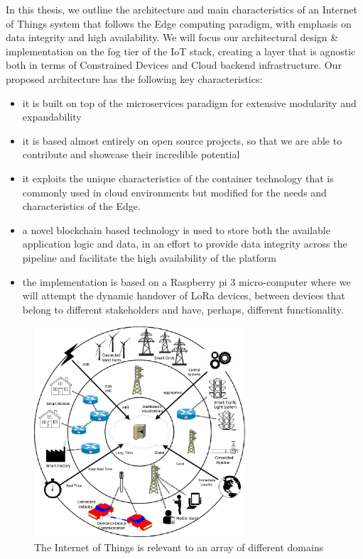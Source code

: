 In this thesis, we outline the architecture and main characteristics of an Internet of Things system that follows the Edge computing paradigm, with emphasis on data integrity and high availability. We will focus our architectural design \& implementation on the fog tier of the IoT stack, creating a layer that is agnostic both in terms of Constrained Devices and Cloud backend infrastructure. Our proposed architecture has the following key characteristics:
\begin{itemize}
 \item it is built on top of the microservices paradigm for extensive modularity and expandability
  \item it is based almost entirely on open source projects, so that we are able to contribute and showcase their incredible potential
 \item it exploits the unique characteristics of the container technology that is commonly used in cloud environments but modified for the needs and characteristics of the Edge.
 \item a novel blockchain based technology is used to store both the available application logic and data, in an effort to provide data integrity across the pipeline and facilitate  the high availability of the platform
\item the implementation is based on a Raspberry pi 3 micro-computer where we will attempt the dynamic handover of LoRa devices, between devices that belong to different stakeholders and have, perhaps, different functionality.
\end{itemize}

\begin{figure}[h]
    \centering
    \includegraphics[width=0.7\textwidth]{images/fogComputingApplications(from-principles).png}
    \caption{The Internet of Things is relevant to an array of different domains\cite{dastjerdi2016fog}}
    \label{fig:fog_comp_app}
\end{figure}

